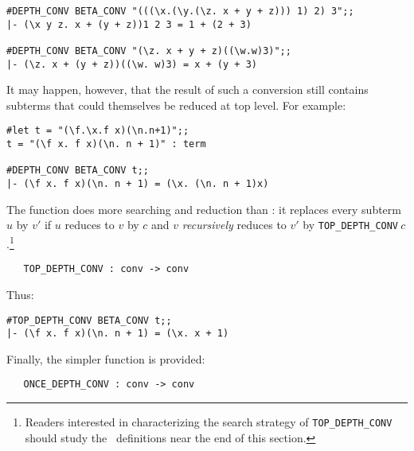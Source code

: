 \setcounter{sessioncount}{1}
\begin{session}\begin{verbatim}
#DEPTH_CONV BETA_CONV "(((\x.(\y.(\z. x + y + z))) 1) 2) 3";;
|- (\x y z. x + (y + z))1 2 3 = 1 + (2 + 3)

#DEPTH_CONV BETA_CONV "(\z. x + y + z)((\w.w)3)";;
|- (\z. x + (y + z))((\w. w)3) = x + (y + 3)
\end{verbatim}\end{session}

It may happen, however, 
that the result of such a conversion still contains subterms
that could themselves be reduced at top level. For example:

\setcounter{sessioncount}{1}
\begin{session}\begin{verbatim}
#let t = "(\f.\x.f x)(\n.n+1)";;
t = "(\f x. f x)(\n. n + 1)" : term

#DEPTH_CONV BETA_CONV t;;
|- (\f x. f x)(\n. n + 1) = (\x. (\n. n + 1)x)
\end{verbatim}\end{session}

\noindent The function 
 does more 
searching and reduction than
: it replaces
every subterm
$u$ by $v'$ if $u$ reduces to $v$ by $c$ and $v$ {\it recursively\/} reduces
to $v'$ by {\tt TOP\_DEPTH\_CONV}$\ c$.\footnote{Readers interested
in characterizing the search strategy of {\tt TOP\_DEPTH\_CONV} should
study the \ML\ definitions near the end of this section.}

\begin{boxed}
\begin{verbatim}
   TOP_DEPTH_CONV : conv -> conv
\end{verbatim}\end{boxed}

\noindent Thus:

\begin{session}\begin{verbatim}
#TOP_DEPTH_CONV BETA_CONV t;;
|- (\f x. f x)(\n. n + 1) = (\x. x + 1)
\end{verbatim}\end{session}

Finally, the simpler function  is provided:

\begin{boxed}
\begin{verbatim}
   ONCE_DEPTH_CONV : conv -> conv
\end{verbatim}\end{boxed}

